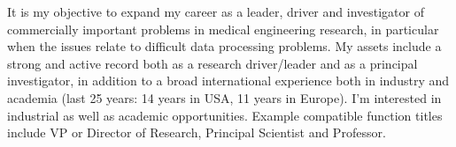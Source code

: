 It is my objective to expand my career as a leader, driver and investigator of commercially important problems in medical engineering research, in particular when the issues relate to difficult data processing problems.  My assets include a strong and active record both as a research driver/leader and as a principal investigator, in addition to a broad international experience both in industry and academia (last 25 years: 14 years in USA, 11 years in Europe). I'm interested in industrial as well as academic opportunities. Example compatible function titles include VP or Director of Research, Principal Scientist and Professor. 